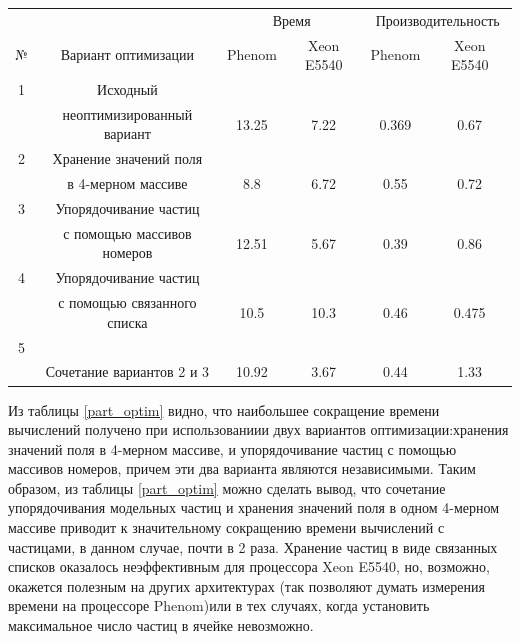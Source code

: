	
	\begin{center}
\label{part_optim}	
\begin{tabular}{|c|c|c|c|c|c|}
\hline			

&& \multicolumn{2}{|c|}{Время} &	
   \multicolumn{2}{|c|}{Производительность}		\\		\cline{3-4} \cline{5-6}
№ &		 Вариант оптимизации                      & Phenom & Xeon  E5540  & Phenom & Xeon  E5540\\ \hline   	
1&Исходный                                          &        &            &        &            \\ 
 &неоптимизированный вариант                        & 13.25  & 7.22       &  0.369 & 0.67           \\ \hline  
2&Хранение значений поля                            &        &            &        &            \\
 & в 4-мерном массиве                               & 8.8    & 6.72       &  0.55  & 0.72       \\ \hline
3&Упорядочивание частиц                             &        &            &        &            \\ 
 & с помощью массивов номеров                       & 12.51  & 5.67       &  0.39  & 0.86           \\ \hline
4 &Упорядочивание частиц                             &        &           &        &            \\   
  & с помощью связанного списка                      & 10.5   & 10.3      &  0.46  & 0.475           \\ \hline
5 &                                                  &        &           &        &            \\
  &Сочетание вариантов 2 и 3			              & 10.92  & 3.67     &  0.44  & 1.33       \\ \hline 
		
\end{tabular}
\end{center}



Из таблицы \ref{part_optim} видно, что наибольшее сокращение времени вычислений получено при использованиии двух вариантов оптимизации:хранения значений поля в  4-мерном массиве, и упорядочивание частиц с помощью массивов номеров, причем эти два варианта являются независимыми. Таким образом, из таблицы \ref{part_optim} можно сделать вывод, что сочетание упорядочивания модельных частиц и хранения значений поля в одном 4-мерном массиве приводит к значительному сокращению времени вычислений с частицами, в данном случае, почти в 2 раза. Хранение частиц в виде связанных списков оказалось неэффективным для процессора Xeon  E5540, но, возможно, окажется полезным на других архитектурах (так позволяют думать измерения времени на процессоре Phenom)или в тех случаях, когда установить максимальное число частиц в ячейке невозможно.

